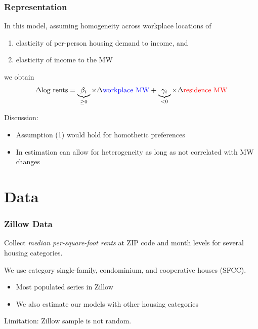 \documentclass[aspectratio=169, t]{beamer}
\begin{document}
\begin{frame}
    \frametitle{Representation}

    In this model, assuming homogeneity across workplace locations of
    \begin{enumerate}
        \item elasticity of per-person housing demand to income, and
        \item elasticity of income to the MW
    \end{enumerate}
    we obtain
    \[
    \Delta \text{log rents} = \underbrace{\beta_i}_{\ge 0} \times \Delta {\color{blue}  \text{workplace MW}}
                            + \underbrace{\gamma_i}_{< 0}  \times \Delta {\color{red} \text{residence MW}}
    \]

    \vspace{3mm}
    \pause
    Discussion:
    \begin{itemize}
        \item Assumption (1) would hold for homothetic preferences
        \item In estimation can allow for heterogeneity as long as not correlated with MW changes
    \end{itemize}

\end{frame}


\section{Data}

\begin{frame}[label = zillow_data]
    \frametitle{Zillow Data}
    
    Collect \textit{median per-square-foot rents} at ZIP code and month levels for several housing categories.
        
    \pause
    \vspace{2mm}
    We use category single-family, condominium, and cooperative houses (SFCC).
    \begin{itemize}
        \item Most populated series in Zillow
        \item We also estimate our models with other housing categories
    \end{itemize}
        
    \vspace{2mm}
    Limitation: Zillow sample is not random.

    \hyperlink{zillow_pop_density}{}
\end{frame}
\end{document}
